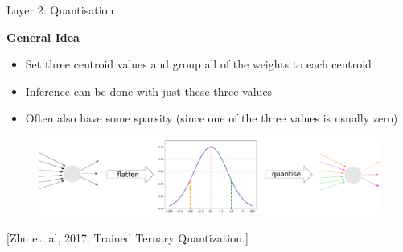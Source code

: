 \documentclass[xcolor=dvipsnames]{beamer}
\begin{document}
\begin{frame}{Layer 2: Quantisation}


{\large\textbf{General Idea}}
\begin{itemize}
    \item Set three centroid values and group all of the weights to each centroid
    \item Inference can be done with just these three values
    \item Often also have some sparsity (since one of the three values is usually zero)
\end{itemize}

\begin{figure}
    \centering
    \includegraphics[width=\linewidth]{images/quantization_pipeline.pdf}
\end{figure}
    
{\footnotesize [Zhu et. al, 2017. Trained Ternary Quantization.]}    

\end{frame}
\end{document}
